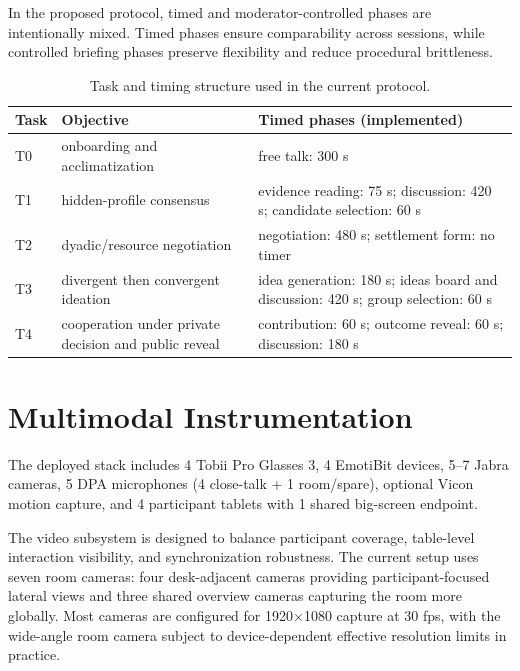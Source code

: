 \documentclass[runningheads]{llncs}
\begin{document}

\noindent In the proposed protocol, timed and moderator-controlled phases are intentionally mixed. Timed phases ensure comparability across sessions, while controlled briefing phases preserve flexibility and reduce procedural brittleness.

\begin{table}[H]
\centering
\small
\caption{Task and timing structure used in the current protocol.}
\begin{tabular}{p{1.2cm}p{4.1cm}p{6.2cm}}
\toprule
Task & Objective & Timed phases (implemented) \\
\midrule
T0 & onboarding and acclimatization & free talk: 300 s \\
T1 & hidden-profile consensus & evidence reading: 75 s; discussion: 420 s; candidate selection: 60 s \\
T2 & dyadic/resource negotiation & negotiation: 480 s; settlement form: no timer\\
T3 & divergent then convergent ideation & idea generation: 180 s; ideas board and discussion: 420 s; group selection: 60 s\\
T4 & cooperation under private decision and public reveal & contribution: 60 s; outcome reveal: 60 s; discussion: 180 s \\
\bottomrule
\end{tabular}
\label{tab:tasks}
\end{table}

\section{Multimodal Instrumentation}


\noindent The deployed stack includes 4 Tobii Pro Glasses 3, 4 EmotiBit devices, 5--7 Jabra cameras, 5 DPA microphones (4 close-talk + 1 room/spare), optional Vicon motion capture, and 4 participant tablets with 1 shared big-screen endpoint.


\noindent The video subsystem is designed to balance participant coverage, table-level interaction visibility, and synchronization robustness. The current setup uses seven room cameras: four desk-adjacent cameras providing participant-focused lateral views and three shared overview cameras capturing the room more globally. Most cameras are configured for 1920$\times$1080 capture at 30 fps, with the wide-angle room camera subject to device-dependent effective resolution limits in practice.
\end{document}
